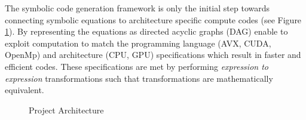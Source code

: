 \documentclass[10pt, conference]{IEEEtran} %
\begin{document}
The symbolic code generation framework is only the initial step towards connecting symbolic equations to architecture specific compute codes (see Figure \ref{fig:sym_framwork}). By representing the equations as directed acyclic graphs (DAG) enable to exploit computation to match the programming language (AVX, CUDA, OpenMp) and architecture (CPU, GPU) specifications which result in faster and efficient codes. These specifications are met by performing \textit{expression to expression} transformations such that transformations are mathematically equivalent. 

\begin{figure}

%
	\caption{ Project Architecture \label{fig:sym_framwork}}
\end{figure}
\end{document}
